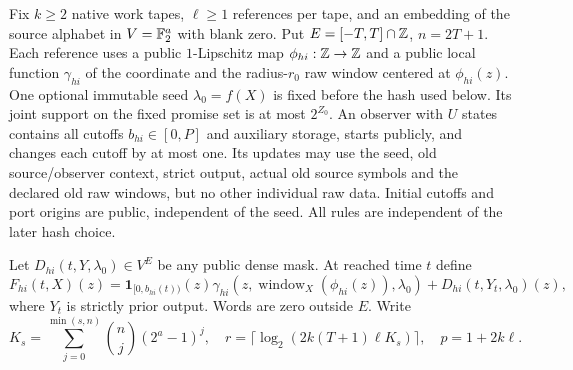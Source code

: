 Fix $k\ge2$ native work tapes, $\ell\ge1$ references per tape, and an
embedding of the source alphabet in $V=\mathbb{F}_2^a$ with blank zero. Put
$E=[-T,T]\cap\mathbb{Z}$, $n=2T+1$. Each reference uses a public $1$-Lipschitz
map $\phi_{hi}:\mathbb{Z}\to\mathbb{Z}$ and a public local function $\gamma_{hi}$ of
the coordinate and the radius-$r_0$ raw window centered at $\phi_{hi}(z)$.
One optional immutable seed $\lambda_0=f(X)$ is fixed before the hash used
below. Its joint support on the fixed promise set is at most $2^{Z_0}$.
An observer with $U$ states contains all cutoffs $b_{hi}\in[0,P]$ and
auxiliary storage, starts publicly, and changes each cutoff by at most one.
Its updates may use the seed, old source/observer context, strict output,
actual old source symbols and the declared old raw windows, but no other
individual raw data. Initial cutoffs and port origins are public, independent
of the seed. All rules are independent of the later hash choice.

Let $D_{hi}(t,Y,\lambda_0)\in V^E$ be any public dense mask. At reached
time $t$ define
\[
 F_{hi}(t,X)(z)=\mathbf1_{[0,b_{hi}(t))}(z)
   \gamma_{hi}(z,\operatorname{window}_X(\phi_{hi}(z)),\lambda_0)
      +D_{hi}(t,Y_t,\lambda_0)(z),
\]
where $Y_t$ is strictly prior output. Words are zero outside $E$.
Write
\[
 K_s=\sum_{j=0}^{\min(s,n)}\binom nj(2^a-1)^j,
 \quad r=\lceil\log_2(2k(T+1)\ell K_s)\rceil,
 \quad p=1+2k\ell.
\]

